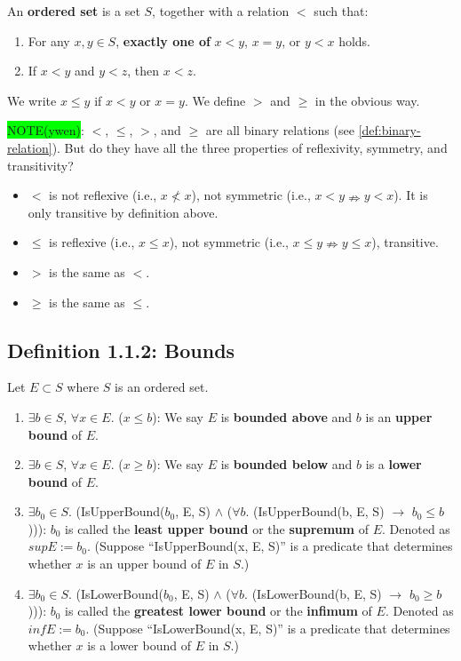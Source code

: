 \documentclass[12pt, letterpaper, oneside]{book}
\begin{document}
An \textbf{ordered set} is a set $S$, together with a relation $<$ such that:
\begin{enumerate}
  \item For any $x, y \in S$, \textbf{exactly one of} $x < y$, $x = y$, or $y < x$ holds.
  \item If $x < y$ and $y < z$, then $x < z$.
\end{enumerate}

We write $x \leq y$ if $x < y$ or $x = y$. We define $>$ and $\geq$ in the obvious way.

\colorbox{lime}{NOTE(ywen)}: $<$, $\le$, $>$, and $\ge$ are all binary relations (see \ref{def:binary-relation}). But
do they have all the three properties of reflexivity, symmetry, and transitivity?
\begin{itemize}
  \item $<$ is not reflexive (i.e., $x \nless x$), not symmetric (i.e., $x < y \nRightarrow y < x $). It is only
        transitive by definition above.
  \item $\le$ is reflexive (i.e., $x \le x$), not symmetric (i.e., $x \le y \nRightarrow y \le x$), transitive.
  \item $>$ is the same as $<$.
  \item $\ge$ is the same as $\le$.
\end{itemize}

\subsection{Definition 1.1.2: Bounds}

Let $E \subset S$ where $S$ is an ordered set.
\begin{enumerate}
  \item $\exists b \in S$, $\forall x \in E$. ($x \le b$): We say $E$ is \textbf{bounded above} and $b$ is an
        \textbf{upper bound} of $E$.
  \item $\exists b \in S$, $\forall x \in E$. ($x \ge b$): We say $E$ is \textbf{bounded below} and $b$ is a
        \textbf{lower bound} of $E$.
  \item $\exists b_0 \in S$. (IsUpperBound($b_0$, E, S) $\land$ ($\forall b$. (IsUpperBound(b, E, S) $\rightarrow$ $b_0 \le b$))):
        $b_0$ is called the \textbf{least upper bound} or the \textbf{supremum} of $E$. Denoted as $sup E := b_0$.
        (Suppose ``IsUpperBound(x, E, S)'' is a predicate that determines whether $x$ is an upper bound of $E$ in $S$.)
  \item $\exists b_0 \in S$. (IsLowerBound($b_0$, E, S) $\land$ ($\forall b$. (IsLowerBound(b, E, S) $\rightarrow$ $b_0 \ge b$))):
        $b_0$ is called the \textbf{greatest lower bound} or the \textbf{infimum} of $E$. Denoted as $inf E := b_0$.
        (Suppose ``IsLowerBound(x, E, S)'' is a predicate that determines whether $x$ is a lower bound of $E$ in $S$.)
\end{enumerate}
\end{document}
